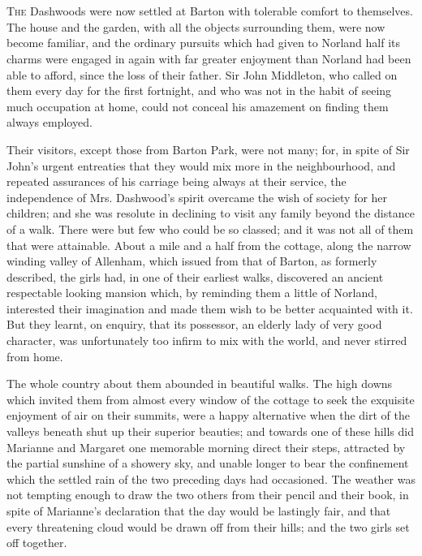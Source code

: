 \chapter[Chapter \thechapter]{}
\lettrine[lines=4,lraise=0.3]{T}{he} Dashwoods were now settled at Barton with tolerable comfort to themselves. The house and the garden, with all the objects surrounding them, were now become familiar, and the ordinary pursuits which had given to Norland half its charms were engaged in again with far greater enjoyment than Norland had been able to afford, since the loss of their father. Sir John Middleton, who called on them every day for the first fortnight, and who was not in the habit of seeing much occupation at home, could not conceal his amazement on finding them always employed.

Their visitors, except those from Barton Park, were not many; for, in spite of Sir John’s urgent entreaties that they would mix more in the neighbourhood, and repeated assurances of his carriage being always at their service, the independence of Mrs. Dashwood’s spirit overcame the wish of society for her children; and she was resolute in declining to visit any family beyond the distance of a walk. There were but few who could be so classed; and it was not all of them that were attainable. About a mile and a half from the cottage, along the narrow winding valley of Allenham, which issued from that of Barton, as formerly described, the girls had, in one of their earliest walks, discovered an ancient respectable looking mansion which, by reminding them a little of Norland, interested their imagination and made them wish to be better acquainted with it. But they learnt, on enquiry, that its possessor, an elderly lady of very good character, was unfortunately too infirm to mix with the world, and never stirred from home.

The whole country about them abounded in beautiful walks. The high downs which invited them from almost every window of the cottage to seek the exquisite enjoyment of air on their summits, were a happy alternative when the dirt of the valleys beneath shut up their superior beauties; and towards one of these hills did Marianne and Margaret one memorable morning direct their steps, attracted by the partial sunshine of a showery sky, and unable longer to bear the confinement which the settled rain of the two preceding days had occasioned. The weather was not tempting enough to draw the two others from their pencil and their book, in spite of Marianne’s declaration that the day would be lastingly fair, and that every threatening cloud would be drawn off from their hills; and the two girls set off together.

